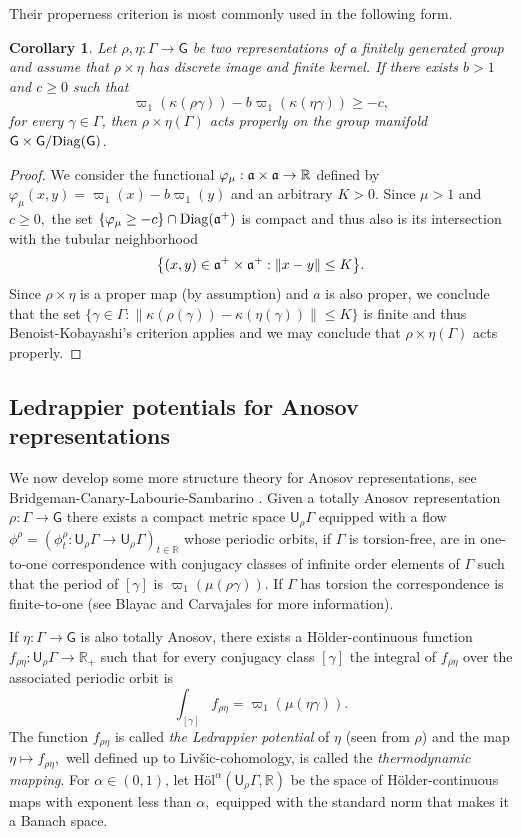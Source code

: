 \documentclass{amsart}
\theoremstyle{plain}
\newtheorem{corollary}[proposition]{Corollary}
\theoremstyle{definition}
\theoremstyle{remark}
\newcommand{\R}{\mathbb R}
\newcommand{\cartan}{a}
\renewcommand{\sf}[1]{{\mathsf{#1}}}
\newcommand{\<}{\left <}
\renewcommand{\>}{\right >}
\newcommand{\G}{\Gamma}
\newcommand{\g}{\gamma}
\renewcommand{\a}{\frak a}
\begin{document}
Their properness criterion is most commonly used in the following form.

\begin{corollary}
\label{crit} 
Let $\rho,\eta:\G\to\sf G$ be two representations of a finitely generated group and assume that $\rho\times\eta$
has discrete image and finite kernel.  If there exists $b>1$ and $c\geq0$ such that 
$$\varpi_1(\kappa(\rho\g))-b\varpi_1(\kappa(\eta\g))\geq -c,$$ 
for every $\g\in\G$, then $\rho\times\eta(\G)$ acts properly on the group manifold $\sf G\times\sf G/\rm{Diag}(\sf G)$.
\end{corollary}



\begin{proof} We consider the functional $\varphi_\mu:\a\times\a\to\R$ defined by $\varphi_\mu(x,y)=\varpi_1(x)-b\varpi_1(y)$ and an arbitrary $K>0.$ 
Since $\mu>1$ and $c\geq0,$ the set $\{\varphi_\mu\geq -c\}\cap \rm{Diag}(\a^+)$ is compact and thus also is its intersection with the tubular neighborhood 
$$\big\{(x,y)\in\a^+\times\a^+:\|x-y\|\leq K\big\}.$$ 
Since $\rho\times\eta$ is a proper map (by assumption) and $\cartan$ is also proper, 
we conclude that the set $\{\g\in\G:\|\kappa(\rho(\g))-\kappa(\eta(\g))\|\leq K\}$ is finite and thus Benoist-Kobayashi's criterion applies and we may
conclude that  $\rho\times\eta(\G)$ acts properly.
\end{proof}




\subsection{Ledrappier potentials for Anosov representations}
\label{Anosov2}
We now develop some more structure theory for Anosov representations, see Bridgeman-Canary-Labourie-Sambarino \cite{pressure}.
Given a totally Anosov representation $\rho:\G\to\sf G$ there exists a compact metric space $\sf U_\rho\G$ equipped with a flow 
$\phi^\rho=(\phi^\rho_t:\sf U_\rho\G\to\sf U_\rho\G)_{t\in\R}$ whose periodic orbits, if $\G$ is torsion-free,  are in one-to-one correspondence 
with conjugacy classes of  infinite order elements of $\G$ such that the period of $[\g]$ is $\varpi_1(\mu(\rho\g))$. If $\G$ has torsion 
the correspondence is finite-to-one (see Blayac \cite{blayac} and Carvajales \cite[Appendix]{carvajales} for more information).

If $\eta:\G\to\sf G$ is also totally Anosov, there exists a H\"older-continuous function $f_{\rho\eta}:\sf U_\rho\G\to\R_+$ 
such that for every conjugacy class $[\g]$ the integral of $f_{\rho\eta}$ over the associated periodic orbit is 
$$\int_{[\g]}f_{\rho\eta}=\varpi_1(\mu(\eta\g)).$$
The function $f_{\rho\eta}$ is called \emph{the Ledrappier potential} of $\eta$ (seen from $\rho$) and the map $\eta\mapsto f_{\rho\eta},$ 
well defined up to Liv\v sic-cohomology, is called the \emph{thermodynamic mapping}. For $\alpha\in(0,1)$, let $
\textrm{H\"ol}^\alpha(\sf U_\rho\G,\R)$ be the space of H\"older-continuous maps with exponent less than $\alpha,$ equipped with the standard 
norm that makes it a Banach space.
\end{document}
